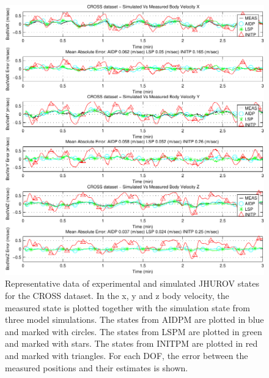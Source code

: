 \begin{center}
\begin{figure}[htbp]
  \begin{center}
    \includegraphics[width=6in]{./chUV_AID/images/SE3_crossBodVel}
  \end{center}
  \caption{
    Representative data of experimental and simulated
    \ac{JHUROV} states for the \ac{CROSS} dataset. In the x, y and z
    body velocity, the measured state is plotted together with the
    simulation state from three model simulations. The states from
    \ac{AIDPM} are plotted in blue and marked with circles.  The
    states from \ac{LSPM} are plotted in green and marked with stars.
    The states from \ac{INITPM} are plotted in red and marked with
    triangles.  For each \ac{DOF}, the error between the measured
    positions and their estimates is shown. 
  }
  \label{chUV_AID.fig.SE3_crossBodVel}
\end{figure}
\end{center}



